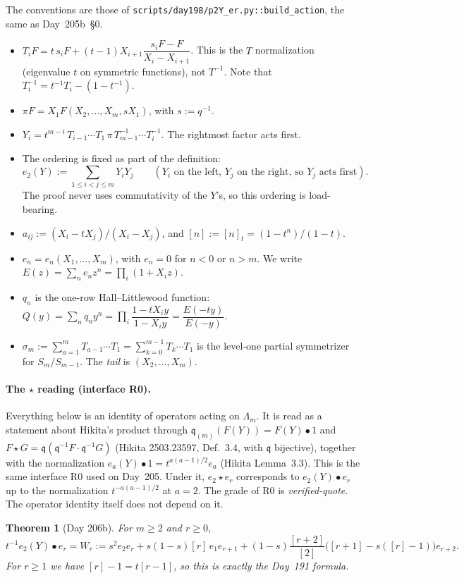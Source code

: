 \documentclass[11pt]{amsart}
\newtheorem{theorem}{Theorem}
\theoremstyle{remark}
\newcommand{\tn}[1]{[#1]}
\newcommand{\qq}{\mathfrak{q}}
\begin{document}
The conventions are those of \texttt{scripts/day198/p2Y\_er.py::build\_action}, the same as Day~205b~\S0.
\begin{itemize}
\item $T_iF = t\,s_iF + (t-1)X_{i+1}\dfrac{s_iF-F}{X_i-X_{i+1}}$. This is the $T$ normalization (eigenvalue $t$ on symmetric functions), not $T^{-1}$. Note that $T_i^{-1} = t^{-1}T_i - (1-t^{-1})$.
\item $\pi F = X_1F(X_2,\dots,X_m,sX_1)$, with $s := q^{-1}$.
\item $Y_i = t^{m-i}\,T_{i-1}\cdots T_1\,\pi\,T_{m-1}^{-1}\cdots T_i^{-1}$. The rightmost factor acts first.
\item The ordering is fixed as part of the definition:
\[
e_2(Y) := \sum_{1\le i<j\le m} Y_iY_j \qquad(\text{$Y_i$ on the left, $Y_j$ on the right, so $Y_j$ acts first}).
\]
The proof never uses commutativity of the $Y$'s, so this ordering is load-bearing.
\item $a_{ij} := (X_i-tX_j)/(X_i-X_j)$, and $\tn{n} := \tn{n}_t = (1-t^n)/(1-t)$.
\item $e_n = e_n(X_1,\dots,X_m)$, with $e_n=0$ for $n<0$ or $n>m$. We write $E(z) = \sum_n e_nz^n = \prod_i(1+X_iz)$.
\item $q_n$ is the one-row Hall--Littlewood function: $Q(y) = \sum_n q_ny^n = \prod_i\dfrac{1-tX_iy}{1-X_iy} = \dfrac{E(-ty)}{E(-y)}$.
\item $\sigma_m := \sum_{a=1}^m T_{a-1}\cdots T_1 = \sum_{k=0}^{m-1}T_k\cdots T_1$ is the level-one partial symmetrizer for $S_m/S_{m-1}$. The \emph{tail} is $(X_2,\dots,X_m)$.
\end{itemize}

\paragraph{The $\star$ reading (interface R0).} Everything below is an identity of operators acting on $\Lambda_m$. It is read as a statement about Hikita's product through $\qq_{(m)}(F(Y)) = F(Y)\bullet 1$ and $F\star G = \qq(\qq^{-1}F\cdot\qq^{-1}G)$ (Hikita 2503.23597, Def.~3.4, with $\qq$ bijective), together with the normalization $e_a(Y)\bullet 1 = t^{a(a-1)/2}e_a$ (Hikita Lemma~3.3). This is the same interface R0 used on Day~205. Under it, $e_2\star e_r$ corresponds to $e_2(Y)\bullet e_r$ up to the normalization $t^{-a(a-1)/2}$ at $a=2$. The grade of R0 is \emph{verified-quote}. The operator identity itself does not depend on it.

\begin{theorem}[Day 206b]\label{thm:main}
For $m\ge 2$ and $r\ge 0$,
\[
t^{-1}e_2(Y)\bullet e_r = W_r := s^2e_2e_r + s(1-s)\tn{r}\,e_1e_{r+1} + (1-s)\frac{\tn{r+2}}{\tn{2}}\bigl(\tn{r+1} - s(\tn{r}-1)\bigr)e_{r+2}.
\]
For $r\ge1$ we have $\tn{r}-1 = t\tn{r-1}$, so this is exactly the Day~191 formula.
\end{theorem}
\end{document}
